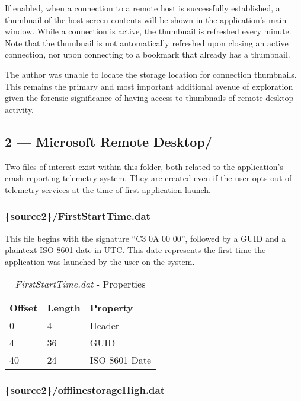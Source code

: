 \documentclass[journal]{IEEEtran}
\begin{document}
If enabled, when a connection to a remote host is successfully established, a thumbnail of the host screen contents will be shown in the application’s main window. While a connection is active, the thumbnail is refreshed every minute. Note that the thumbnail is not automatically refreshed upon closing an active connection, nor upon connecting to a bookmark that already has a thumbnail.

The author was unable to locate the storage location for connection thumbnails. This remains the primary and most important additional avenue of exploration given the forensic significance of having access to thumbnails of remote desktop activity.

\subsection{2 — Microsoft Remote Desktop/}

Two files of interest exist within this folder, both related to the application’s crash reporting telemetry system. They are created even if the user opts out of telemetry services at the time of first application launch.\\

\subsubsection{\{source2\}/FirstStartTime.dat}

This file begins with the signature “C3 0A 00 00”, followed by a GUID and a plaintext ISO 8601\cite{noauthor_iso_nodate} date in UTC. This date represents the first time the application was launched by the user on the system.

\begin{table}[h!]
\caption{\textit{FirstStartTime.dat} - Properties}
\begin{center}
\begin{tabular}{lll}
Offset & Length & Property      \\ \hline
0      & 4      & Header        \\
4      & 36     & GUID          \\
40     & 24     & ISO 8601 Date
\end{tabular}
\end{center}
\end{table}

\noindent
\subsubsection{\{source2\}/offlinestorageHigh.dat}
\end{document}
